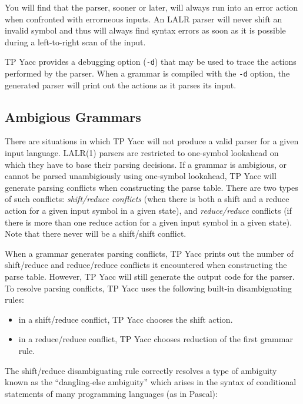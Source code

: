 You will find that the parser, sooner or later, will always run into an
error action when confronted with errorneous inputs. An LALR parser will
never shift an invalid symbol and thus will always find syntax errors as
soon as it is possible during a left-to-right scan of the input.

TP Yacc provides a debugging option (\verb"-d") that may be used to trace
the actions performed by the parser. When a grammar is compiled with the
\verb"-d" option, the generated parser will print out the actions as it
parses its input.

\subsection{Ambigious Grammars}

There are situations in which TP Yacc will not produce a valid parser for
a given input language. LALR(1) parsers are restricted to one-symbol
lookahead on which they have to base their parsing decisions. If a
grammar is ambigious, or cannot be parsed unambigiously using one-symbol
lookahead, TP Yacc will generate parsing conflicts when constructing the
parse table. There are two types of such conflicts: {\em shift/reduce
conflicts\/} (when there is both a shift and a reduce action for a given
input symbol in a given state), and {\em reduce/reduce\/} conflicts (if
there is more than one reduce action for a given input symbol in a given
state). Note that there never will be a shift/shift conflict.

When a grammar generates parsing conflicts, TP Yacc prints out the number
of shift/reduce and reduce/reduce conflicts it encountered when constructing
the parse table. However, TP Yacc will still generate the output code for the
parser. To resolve parsing conflicts, TP Yacc uses the following built-in
disambiguating rules:

\begin{itemize}
   \item
      in a shift/reduce conflict, TP Yacc chooses the shift action.
   \item
      in a reduce/reduce conflict, TP Yacc chooses reduction of the first
      grammar rule.
\end{itemize}

The shift/reduce disambiguating rule correctly resolves a type of
ambiguity known as the ``dangling-else ambiguity'' which arises in the
syntax of conditional statements of many programming languages (as in
Pascal):

